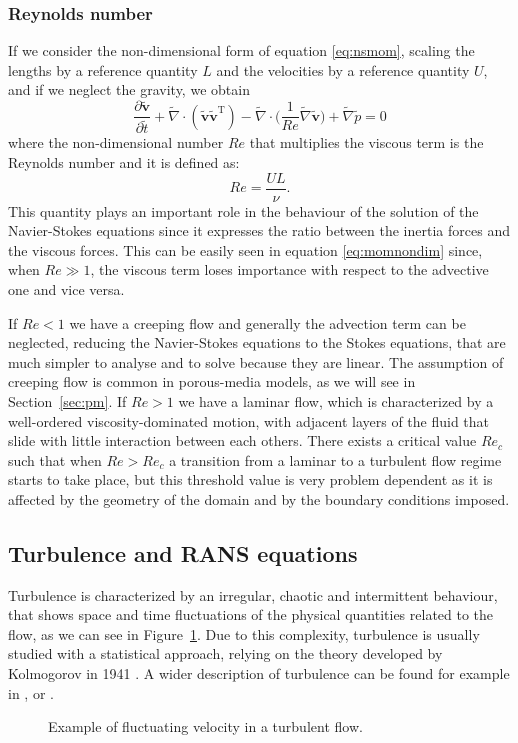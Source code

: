 \subsubsection{Reynolds number}
If we consider the non-dimensional form of equation \eqref{eq:nsmom}, scaling 
the lengths by a reference quantity $L$ and the velocities by a reference 
quantity $U$, and if we neglect the gravity, we obtain
\begin{equation} \label{eq:momnondim}
	\frac{\partial{\tilde{\mathbf{v}}}}{\partial \tilde{t}} + \tilde{\nabla} 
	\cdot (\tilde{\mathbf{v}} \tilde{\mathbf{v}}^\mathrm{T}) - \tilde{\nabla} 
	\cdot \bigg(\frac{1}{Re} \tilde{\nabla} \tilde{\mathbf{v}}\bigg) + 
	\tilde{\nabla} 
	\tilde{p} = 0
\end{equation}
where the non-dimensional number $Re$ that multiplies the viscous term is the 
Reynolds number and it is defined as:
\begin{equation}
Re = \frac{UL}{\nu}.
\end{equation}
This quantity plays an important role in the behaviour of the solution of the 
Navier-Stokes equations since it expresses the ratio between the inertia forces 
and the viscous forces. This can be easily seen in equation 
\eqref{eq:momnondim} since, when $Re\gg 1$, the viscous term loses 
importance with respect to the advective one and vice versa.

If $Re < 1$ we have a creeping flow and generally the advection term can 
be neglected, reducing the Navier-Stokes equations to the Stokes equations, 
that are much simpler to analyse and to solve because they are linear. The 
assumption of creeping flow is common in porous-media models, as we will 
see in Section~\ref{sec:pm}. If $Re>1$ we have a laminar flow, which is 
characterized by a well-ordered viscosity-dominated motion, with adjacent 
layers of the fluid that slide with little interaction between each others.
There exists a critical value $Re_c$ such that when $Re>Re_c$ a 
transition from a laminar to a turbulent flow regime starts to take place, but 
this threshold value is very problem dependent as it is affected by the 
geometry of the domain and by the boundary conditions imposed.
%
\subsection{Turbulence and RANS equations}
Turbulence is characterized by an irregular, chaotic and intermittent 
behaviour, that shows space and time fluctuations of the physical quantities 
related to the flow, as we can see in Figure~\ref{fig:fluctuations}. Due to 
this complexity, turbulence is usually studied with 
a statistical approach, relying on the theory developed by Kolmogorov 
in 1941 \cite{turbo:kolmogorov}. A wider description of turbulence can be 
found for example in \cite{main:pope}, \cite{main:wilcox} or 
\cite{main:davidson}.
\begin{figure}[ht]
	\centering
	
	\caption[Fluctuating velocity in a turbulent flow]{Example of fluctuating 
	velocity in a turbulent flow.} %
	\label{fig:fluctuations}
\end{figure}


